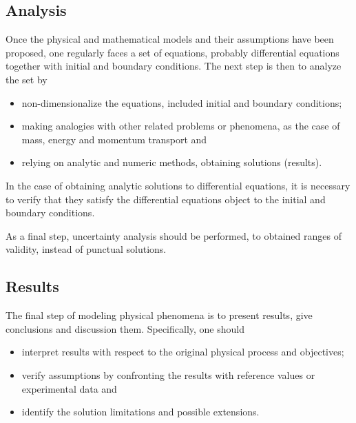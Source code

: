 \subsection{Analysis}
Once the physical and mathematical models and their assumptions have been proposed, one regularly faces a set of equations, probably differential equations together with initial and boundary conditions. The next step is then to analyze the set by
\begin{itemize}
\item non-dimensionalize the equations, included initial and boundary conditions;
\item making analogies with other related problems or phenomena, as the case of mass, energy and momentum transport and
\item relying on analytic and numeric methods, obtaining solutions (results).
\end{itemize}

In the case of obtaining analytic solutions to differential equations, it is necessary to verify that they satisfy the differential equations object to the initial and boundary conditions.

As a final step, uncertainty analysis should be performed, to obtained ranges of validity, instead of punctual solutions.


\subsection{Results}
The final step of modeling physical phenomena is to present results, give conclusions and discussion them. Specifically, one should
\begin{itemize}
\item interpret results with respect to the original physical process and objectives;
\item verify assumptions by confronting the results with reference values or experimental data and
\item identify the solution limitations and possible extensions.
\end{itemize}
